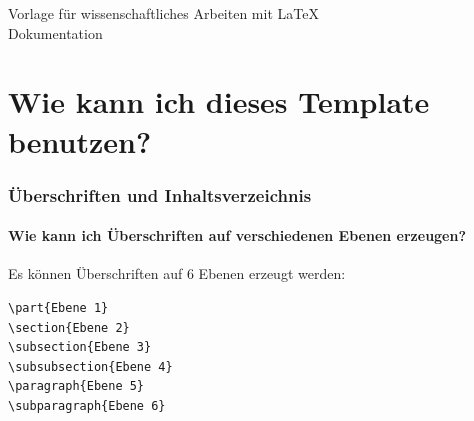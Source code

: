 \documentclass[12pt]{article}
\begin{document}
\renewcommand{\mytitle}{Dokumentation/Tutorial}%
\renewcommand{\myauthor}{Dr. Frank N. Furter}%

\begin{center}
\vspace*{2cm}
\LARGE{Vorlage für wissenschaftliches Arbeiten mit LaTeX\\[6pt]Dokumentation}
\end{center}

\clearpage

%

\frontmatter%


\renewcommand{\plaintitle}{Inhaltsverzeichnis}%
{\def\makebox[#1][#2]#3{#3}%
	\tableofcontents
}

\clearpage
\mainmatter%

\part{Wie kann ich dieses Template benutzen?}

\section{Überschriften und Inhaltsverzeichnis}

\subsection{Wie kann ich Überschriften auf verschiedenen Ebenen erzeugen?}
Es können Überschriften auf 6 Ebenen erzeugt werden:
\begin{verbatim}
\part{Ebene 1}
\section{Ebene 2}
\subsection{Ebene 3}
\subsubsection{Ebene 4}
\paragraph{Ebene 5}
\subparagraph{Ebene 6}
\end{verbatim}
\end{document}
